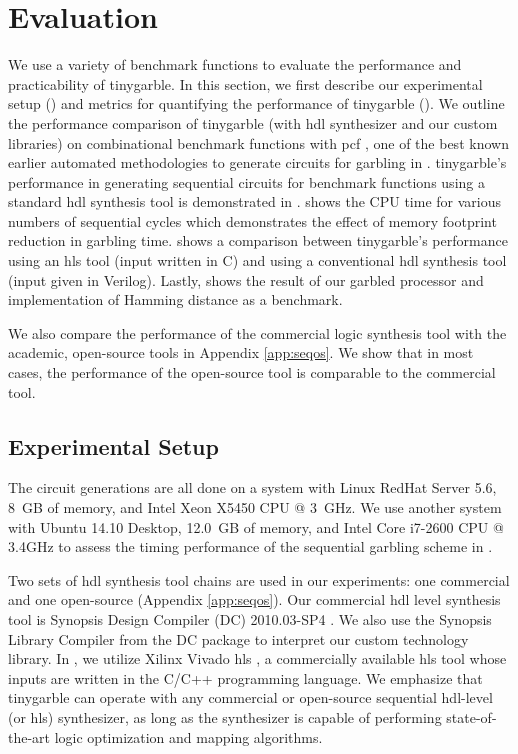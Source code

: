 \chapter{Evaluation}
We use a variety of benchmark functions to evaluate the performance and practicability of \gls{tinygarble}.
In this section, we first describe our experimental setup () and metrics for quantifying the performance of \gls{tinygarble} ().
We outline the performance comparison of \gls{tinygarble} (with \acrshort{hdl} synthesizer and our custom libraries) on combinational benchmark functions with \gls{pcf} \cite{kreuter2013pcf}, one of the best known earlier automated methodologies to generate circuits for garbling in .
\gls{tinygarble}'s performance in generating sequential circuits for benchmark functions using a standard \acrshort{hdl} synthesis tool is demonstrated in .
 shows the CPU time for various numbers of sequential cycles which demonstrates the effect of memory footprint reduction in garbling time.
 shows a comparison between \gls{tinygarble}'s performance using an \acrshort{hls} tool (input written in C) and using a conventional \acrshort{hdl} synthesis tool (input given in Verilog).
Lastly,  shows the result of our garbled processor and implementation of Hamming distance as a benchmark.

We also compare the performance of the commercial logic synthesis tool with the academic, open-source tools in Appendix \ref{app:seqos}.
We show that in most cases, the performance of the open-source tool is comparable to the commercial tool.

\section{Experimental Setup}
The circuit generations are all done on a system with Linux RedHat Server 5.6, 8~GB of memory, and Intel Xeon X5450 CPU @ 3~GHz.
We use another system with Ubuntu 14.10 Desktop, 12.0~GB of memory, and Intel Core i7-2600 CPU @ 3.4GHz to assess the timing performance of the sequential garbling scheme in .

Two sets of \acrshort{hdl} synthesis tool chains are used in our experiments: one commercial and one open-source (Appendix \ref{app:seqos}).
Our commercial \acrshort{hdl} level synthesis tool is Synopsis Design Compiler (DC) 2010.03-SP4 \cite{tool:DesignCompiler}.
We also use the Synopsis Library Compiler from the DC package to interpret our custom technology library.
In , we utilize Xilinx Vivado \acrshort{hls} \cite{tool:Vivado}, a commercially available \acrshort{hls} tool whose inputs are written in the C/C++ programming language.
We emphasize that \gls{tinygarble} can operate with any commercial or open-source sequential \acrshort{hdl}-level (or \acrshort{hls}) synthesizer, as long as the synthesizer is capable of performing state-of-the-art logic optimization and mapping algorithms.

